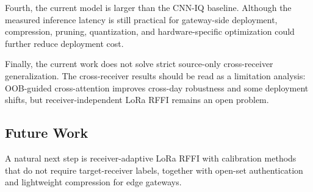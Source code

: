Fourth, the current model is larger than the CNN-IQ baseline. Although the measured inference latency is still practical for gateway-side deployment, compression, pruning, quantization, and hardware-specific optimization could further reduce deployment cost.

Finally, the current work does not solve strict source-only cross-receiver generalization. The cross-receiver results should be read as a limitation analysis: OOB-guided cross-attention improves cross-day robustness and some deployment shifts, but receiver-independent LoRa RFFI remains an open problem.

\subsection{Future Work}

A natural next step is receiver-adaptive LoRa RFFI with calibration methods that do not require target-receiver labels, together with open-set authentication and lightweight compression for edge gateways.
